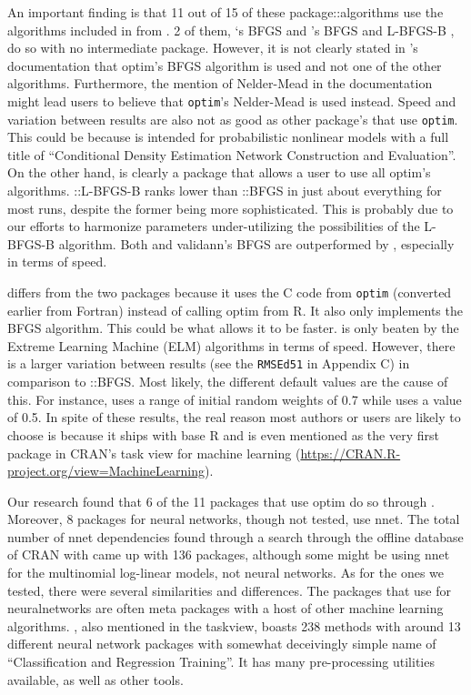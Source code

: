 An important finding is that 11 out of 15 of these package::algorithms
use the algorithms included in  from . 2 of
them, `s BFGS \citep{R-CaDENCE} and
's BFGS and L-BFGS-B \citep{R-validann}, do so with no
intermediate package. However, it is not clearly stated in
's documentation that optim's BFGS algorithm is used
and not one of the other algorithms. Furthermore, the mention of
Nelder-Mead in the documentation might lead users to believe that
\texttt{optim}'s Nelder-Mead is used instead. Speed and variation
between results are also not as good as other package's that use
\texttt{optim}. This could be because  is intended for
probabilistic nonlinear models with a full title of ``Conditional
Density Estimation Network Construction and Evaluation''. On the other
hand,  is clearly a package that allows a user to use
all optim's algorithms. ::L-BFGS-B ranks lower than
::BFGS in just about everything for most runs, despite
the former being more sophisticated. This is probably due to our efforts
to harmonize parameters under-utilizing the possibilities of the
L-BFGS-B algorithm. Both  and validann's BFGS are
outperformed by , especially in terms of speed.

 \citep{R-nnet} differs from the two packages because it
uses the C code from \texttt{optim} (converted earlier from Fortran)
instead of calling optim from R. It also only implements the BFGS
algorithm. This could be what allows it to be faster.  is
only beaten by the Extreme Learning Machine (ELM) algorithms in terms of
speed. However, there is a larger variation between results (see the
\texttt{RMSEd51} in Appendix C) in comparison to
::BFGS. Most likely, the different default values are
the cause of this. For instance,  uses a range of initial
random weights of 0.7 while  uses a value of 0.5. In
spite of these results, the real reason most authors or users are likely
to choose  is because it ships with base R and is even
mentioned as the very first package in CRAN's task view for machine
learning (\url{https://CRAN.R-project.org/view=MachineLearning}).

Our research found that 6 of the 11 packages that use optim do so
through . Moreover, 8 packages for neural networks, though
not tested, use nnet. The total number of nnet dependencies found
through a search through the offline database of CRAN with
 came up with 136 packages, although some might be
using nnet for the multinomial log-linear models, not neural networks.
As for the ones we tested, there were several similarities and
differences. The packages that use  for neuralnetworks are
often meta packages with a host of other machine learning algorithms.
 \citep{R-caret}, also mentioned in the taskview, boasts
238 methods with around 13 different neural network packages with
somewhat deceivingly simple name of ``Classification and Regression
Training''. It has many pre-processing utilities available, as well as
other tools.

